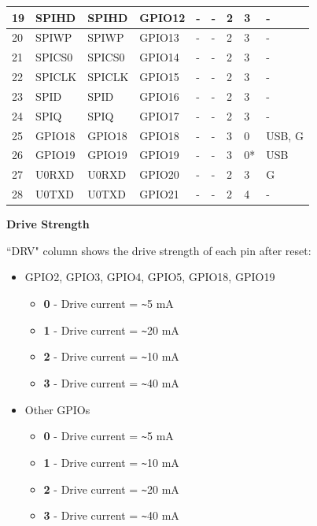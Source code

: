 \begin{longtable}[c]{|p{0.7cm}|p{1.9cm}|p{1.9cm}|p{1.7cm}|p{1.7cm}|p{1.7cm}|p{1cm}|p{1cm}|p{1.0cm}| }
19 & SPIHD           &  SPIHD        & GPIO12  & -          & -            & 2           & 3 & - \\ \hline
20 & SPIWP           &  SPIWP        & GPIO13  & -          & -            & 2           & 3 & - \\ \hline
21 & SPICS0          &  SPICS0       & GPIO14  & -          & -            & 2           & 3 & - \\ \hline
22 & SPICLK          &  SPICLK       & GPIO15  & -          & -            & 2           & 3 & - \\ \hline
23 & SPID            &  SPID         & GPIO16  & -          & -            & 2           & 3 & - \\ \hline
24 & SPIQ            &  SPIQ         & GPIO17  & -          & -            & 2           & 3 & - \\ \hline
25 & GPIO18          &  GPIO18       & GPIO18  & -          & -            & 3           & 0 & USB, G \\ \hline
26 & GPIO19          &  GPIO19       & GPIO19  & -          & -            & 3           & 0* & USB \\ \hline
27 & U0RXD           &  U0RXD        & GPIO20  & -          & -            & 2           & 3 & G \\ \hline
28 & U0TXD           &  U0TXD        & GPIO21  & -          & -            & 2           & 4 & - \\ \hline

    \end{longtable}
\normalsize

\textbf{Drive Strength}

``DRV" column shows the drive strength of each pin after reset:

\begin{itemize}
    \item GPIO2, GPIO3, GPIO4, GPIO5, GPIO18, GPIO19
    \begin{itemize}
        \item \textbf{0} - Drive current = \verb+~+5 mA
        \item \textbf{1} - Drive current = \verb+~+20 mA
        \item \textbf{2} - Drive current = \verb+~+10 mA
        \item \textbf{3} - Drive current = \verb+~+40 mA
    \end{itemize}
    \item Other GPIOs
    \begin{itemize}
        \item \textbf{0} - Drive current = \verb+~+5 mA
        \item \textbf{1} - Drive current = \verb+~+10 mA
        \item \textbf{2} - Drive current = \verb+~+20 mA
        \item \textbf{3} - Drive current = \verb+~+40 mA
    \end{itemize}
\end{itemize}


